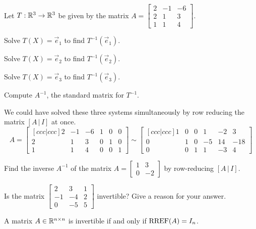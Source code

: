 \begin{applicationActivities}
\begin{activity}{20}
  Let \(T: \mathbb{R}^3 \rightarrow \mathbb{R}^3\) be given by the matrix
  \(A=\begin{bmatrix} 2 & -1 & -6 \\ 2 & 1 & 3 \\ 1 & 1 & 4 \end{bmatrix}\).
  \begin{subactivity}
  Solve $T(X)=\vec{e}_1$ to find $T^{-1}(\vec{e}_1)$.
  \end{subactivity}
  \begin{subactivity}
   Solve $T(X)=\vec{e}_2$ to find $T^{-1}(\vec{e}_2)$.
  \end{subactivity}
  \begin{subactivity}
   Solve $T(X)=\vec{e}_3$ to find $T^{-1}(\vec{e}_3)$.
  \end{subactivity}
  \begin{subactivity}
  Compute $A^{-1}$, the standard matrix for $T^{-1}$.
  \end{subactivity}
\end{activity}

\begin{observation}
We could have solved these three systems simultaneously
by row reducing the matrix \([A\,|\,I]\) at once.
\[
  A=\begin{bmatrix}[ccc|ccc]
    2 & -1 & -6 & 1 & 0 & 0 \\
    2 & 1 & 3 & 0 & 1 & 0 \\
    1 & 1 & 4 & 0 & 0 & 1
  \end{bmatrix} \sim
  \begin{bmatrix}[ccc|ccc]
    1 & 0 & 0 & 1 & -2 & 3 \\
    0 & 1 & 0 & -5 & 14 & -18 \\
    0 & 0 & 1 & 1 & -3 & 4
  \end{bmatrix}
\]
\end{observation}


\begin{activity}{10}
  Find the inverse \(A^{-1}\) of the matrix
  \(A=\begin{bmatrix} 1 & 3 \\ 0 & -2 \end{bmatrix}\)
  by row-reducing \([A\,|\,I]\).
\end{activity}

\begin{activity}{10}
Is the matrix $\begin{bmatrix} 2 & 3 & 1 \\ -1 & -4 & 2 \\ 0 & -5 & 5 \end{bmatrix}$ invertible? Give a reason for your answer.
\end{activity}

\begin{observation}
 A matrix $A \in \mathbb{R}^{n \times n}$ is invertible if and only if $\operatorname{RREF}(A) = I_n$.
\end{observation}

\end{applicationActivities}
